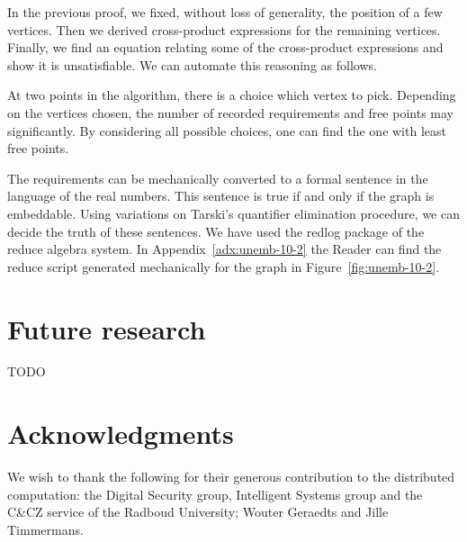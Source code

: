 \documentclass[a4paper]{article}
\newcounter{main}
\theoremstyle{definition}
\theoremstyle{remark}
\begin{document}

In the previous proof, we fixed, without loss of generality, the position
of a few vertices.  Then we derived cross-product expressions for the
remaining vertices.  Finally, we find an equation relating some of
the cross-product expressions and show it is unsatisfiable.
We can automate this reasoning as follows.

\begin{algorithm}
\end{algorithm}
At two points in the algorithm, there is a choice which vertex to pick.
Depending on the vertices chosen, the number of recorded requirements
and free points may significantly.  By considering all possible choices,
one can find the one with least free points.

The requirements can be mechanically converted
to a formal sentence
in the language of the real numbers.
This sentence is true if and only if the graph is embeddable.
Using variations on Tarski's quantifier elimination procedure,
we can decide the truth of these sentences.
We have used the redlog\cite{redlog} package of the reduce algebra
system.  In Appendix~\ref{adx:unemb-10-2} the Reader can find
the reduce script generated mechanically for the graph
in Figure~\ref{fig:unemb-10-2}.
%

\section{Future research}
TODO

\section{Acknowledgments}
We wish to thank the following for their generous contribution to the
distributed computation:
    the Digital Security group, Intelligent Systems group
    and the C\&CZ service of the Radboud University;
    Wouter Geraedts and
    Jille Timmermans.
\end{document}
